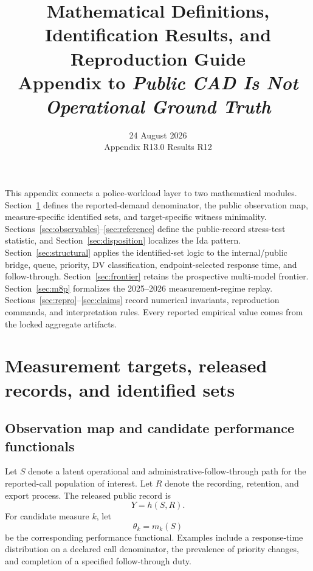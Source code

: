 \documentclass[11pt]{article}
\title{\vspace{-1.6em}\textbf{Mathematical Definitions, Identification Results, and Reproduction Guide}\\[0.35em]
\large Appendix to \emph{Public CAD Is Not Operational Ground Truth}}
\author{}
\date{24 August 2026\\[0.2em]\small Appendix R13.0 \quad Results R12}
\begin{document}
\maketitle
\thispagestyle{plain}
\vspace{-1.2em}

\begin{plainbox}[title=Purpose and reading guide]
This appendix connects a police-workload layer to two mathematical modules. Section~\ref{sec:measurement_map} defines the reported-demand denominator, the public observation map, measure-specific identified sets, and target-specific witness minimality. Sections~\ref{sec:observables}--\ref{sec:reference} define the public-record stress-test statistic, and Section~\ref{sec:disposition} localizes the Ida pattern. Section~\ref{sec:structural} applies the identified-set logic to the internal/public bridge, queue, priority, DV classification, endpoint-selected response time, and follow-through. Section~\ref{sec:frontier} retains the prospective multi-model frontier. Section~\ref{sec:m8p} formalizes the 2025--2026 measurement-regime replay. Sections~\ref{sec:repro}--\ref{sec:claims} record numerical invariants, reproduction commands, and interpretation rules. Every reported empirical value comes from the locked aggregate artifacts.
\end{plainbox}

\setcounter{tocdepth}{1}
\begingroup
\small
\tableofcontents
\endgroup
\newpage

\section{Measurement targets, released records, and identified sets}
\label{sec:measurement_map}

\subsection{Observation map and candidate performance functionals}

Let $S$ denote a latent operational and administrative-follow-through path for the reported-call population of interest. Let $R$ denote the recording, retention, and export process. The released public record is
\begin{equation}
Y=h(S,R).
\label{eq:observation_map}
\end{equation}
For candidate measure $k$, let
\begin{equation}
\theta_k=m_k(S)
\label{eq:performance_functional}
\end{equation}
be the corresponding performance functional. Examples include a response-time distribution on a declared call denominator, the prevalence of priority changes, and completion of a specified follow-through duty.
\end{document}
